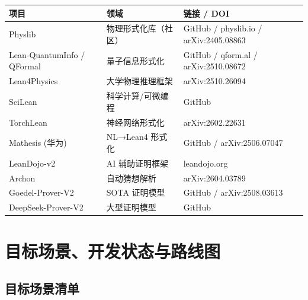 \documentclass[
  11pt,
  a4paper,
]{ctexrep}
\newcounter{none} %
\begin{document}
{\def\LTcaptype{none} %
\begin{longtable}[]{@{}
  >{\raggedright\arraybackslash}p{}
  >{\raggedright\arraybackslash}p{}
  >{\raggedright\arraybackslash}p{}@{}}
\toprule\noalign{}
\begin{minipage}[b]{\linewidth}\raggedright
项目
\end{minipage} & \begin{minipage}[b]{\linewidth}\raggedright
领域
\end{minipage} & \begin{minipage}[b]{\linewidth}\raggedright
链接 / DOI
\end{minipage} \\
\midrule\noalign{}
\endhead
\bottomrule\noalign{}
\endlastfoot
Physlib & 物理形式化库（社区） & GitHub / physlib.io /
arXiv:2405.08863 \\
Lean-QuantumInfo / QFormal & 量子信息形式化 & GitHub / qform.al /
arXiv:2510.08672 \\
Lean4Physics & 大学物理推理框架 & arXiv:2510.26094 \\
SciLean & 科学计算/可微编程 & GitHub \\
TorchLean & 神经网络形式化 & arXiv:2602.22631 \\
Mathesis (华为) & NL→Lean4 形式化 & GitHub / arXiv:2506.07047 \\
LeanDojo-v2 & AI 辅助证明框架 & leandojo.org \\
Archon & 自动猜想解析 & arXiv:2604.03789 \\
Goedel-Prover-V2 & SOTA 证明模型 & GitHub / arXiv:2508.03613 \\
DeepSeek-Prover-V2 & 大型证明模型 & GitHub \\
\end{longtable}
}

\newpage


\chapter{目标场景、开发状态与路线图}\label{ux76eeux6807ux573aux666fux5f00ux53d1ux72b6ux6001ux4e0eux8defux7ebfux56fe}

\section{目标场景清单}\label{sec-scenarios}
\end{document}
